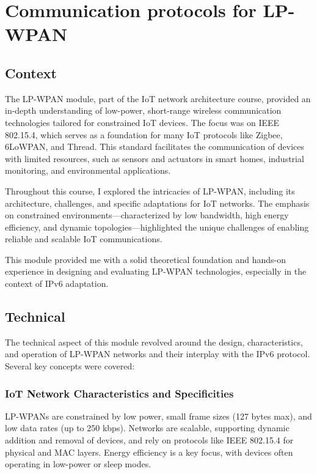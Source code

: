 \section{Communication protocols for LP-WPAN}
\subsection{Context}

\indent \indent The LP-WPAN module, part of the IoT network architecture course, provided an in-depth understanding of low-power, short-range wireless communication technologies tailored for constrained IoT devices.
The focus was on IEEE 802.15.4, which serves as a foundation for many IoT protocols like Zigbee, 6LoWPAN, and Thread.
This standard facilitates the communication of devices with limited resources, such as sensors and actuators in smart homes, industrial monitoring, and environmental applications.

\vspace{0.25cm}
\indent Throughout this course, I explored the intricacies of LP-WPAN, including its architecture, challenges, and specific adaptations for IoT networks.
The emphasis on constrained environments—characterized by low bandwidth, high energy efficiency, and dynamic topologies—highlighted the unique challenges of enabling reliable and scalable IoT communications.

\vspace{0.25cm}
\indent This module provided me with a solid theoretical foundation and hands-on experience in designing and evaluating LP-WPAN technologies, especially in the context of IPv6 adaptation.

\subsection{Technical}
The technical aspect of this module revolved around the design, characteristics, and operation of LP-WPAN networks and their interplay with the IPv6 protocol.
Several key concepts were covered:

\subsubsection{IoT Network Characteristics and Specificities}
LP-WPANs are constrained by low power, small frame sizes (127 bytes max), and low data rates (up to 250 kbps).
Networks are scalable, supporting dynamic addition and removal of devices, and rely on protocols like IEEE 802.15.4 for physical and MAC layers.
Energy efficiency is a key focus, with devices often operating in low-power or sleep modes.

